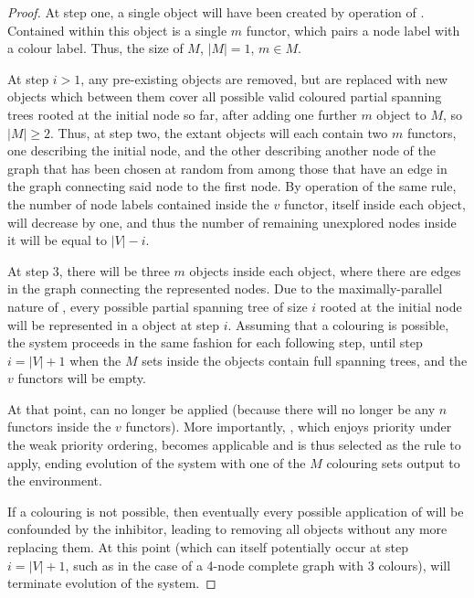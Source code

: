 \begin{proof}

At step one, a single \bo{} object will have been created by operation of .  Contained within this \bo{} object is a single \(m\) functor, which pairs a node label with a colour label.  Thus, the size of \(M\), \(|M| = 1\), \(m \in M\).

At step \(i > 1\), any pre-existing \bo{} objects are removed, but are replaced with new \bo{} objects which between them cover all possible valid coloured partial spanning trees rooted at the initial node so far, after adding one further \(m\) object to \(M\), so \(|M| \geq 2\).  Thus, at step two, the extant \bo{} objects will each contain two \(m\) functors, one describing the initial node, and the other describing another node of the graph that has been chosen at random from among those that have an edge in the graph connecting said node to the first node.  By operation of the same rule, the number of node labels contained inside the \(v\) functor, itself inside each \bo{} object, will decrease by one, and thus the number of remaining unexplored nodes inside it will be equal to \(|V| - i\).

At step 3, there will be three \(m\) objects inside each \bo{} object, where there are edges in the graph connecting the represented nodes.  Due to the maximally-parallel nature of , every possible partial spanning tree of size \(i\) rooted at the initial node will be represented in a \bo{} object at step \(i\).  Assuming that a colouring is possible, the system proceeds in the same fashion for each following step, until step \(i = |V| + 1\) when the \(M\) sets inside the \bo{} objects contain full spanning trees, and the \(v\) functors will be empty.

At that point,  can no longer be applied (because there will no longer be any \(n\) functors inside the \(v\) functors).  More importantly, , which enjoys priority under the weak priority ordering, becomes applicable and is thus selected as the rule to apply, ending evolution of the system with one of the \(M\) colouring sets output to the environment.

If a colouring is not possible, then eventually every possible application of  will be confounded by the \gls{inhibitor}, leading to  removing all \bo{} objects without any more replacing them.  At this point (which can itself potentially occur at step \(i = |V| + 1\), such as in the case of a 4-node complete graph with 3 colours),  will terminate evolution of the system.
\end{proof}

